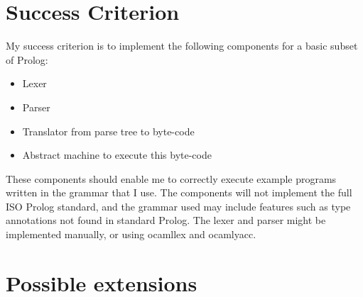 \documentclass[12pt, a4paper]{article}
\begin{document}
\section*{Success Criterion}

My success criterion is to implement the following components for a basic subset of Prolog:

\begin{itemize}
\item Lexer
\item Parser 
\item Translator from parse tree to byte-code 
\item Abstract machine to execute this byte-code
\end{itemize}

These components should enable me to correctly execute example programs written in the grammar that I use. The components will not implement the full ISO Prolog standard, and the grammar used may include features such as type annotations not found in standard Prolog. The lexer and parser might be implemented manually, or using ocamllex and ocamlyacc.

\section*{Possible extensions}
\end{document}
